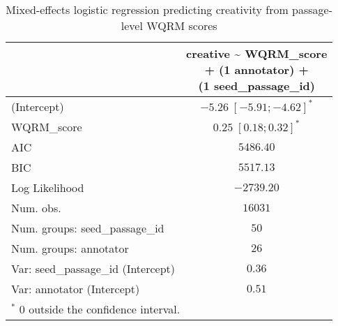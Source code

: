 
\usepackage{booktabs}

\begin{table}[htbp]
\begin{center}
\begin{tabular}{l c}
\toprule
 & \shortstack[l]{creative \textasciitilde{} WQRM\_score  \\ 
+ (1 \textbar{} annotator) + \\ 
(1 \textbar{} seed\_passage\_id)} \\
\midrule
(Intercept)                        & $-5.26 \; [-5.91; -4.62]^{*}$ \\
WQRM\_score                        & $0.25 \; [ 0.18;  0.32]^{*}$  \\
\midrule
AIC                                & $5486.40$                     \\
BIC                                & $5517.13$                     \\
Log Likelihood                     & $-2739.20$                    \\
Num. obs.                          & $16031$                       \\
Num. groups: seed\_passage\_id     & $50$                          \\
Num. groups: annotator             & $26$                          \\
Var: seed\_passage\_id (Intercept) & $0.36$                        \\
Var: annotator (Intercept)         & $0.51$                        \\
\bottomrule
\multicolumn{2}{l}{\scriptsize{$^*$ 0 outside the confidence interval.}}
\end{tabular}
\caption{Mixed-effects logistic regression predicting creativity from passage-level WQRM scores}
\label{tab:glmer_nov_src_front}
\end{center}
\end{table}
